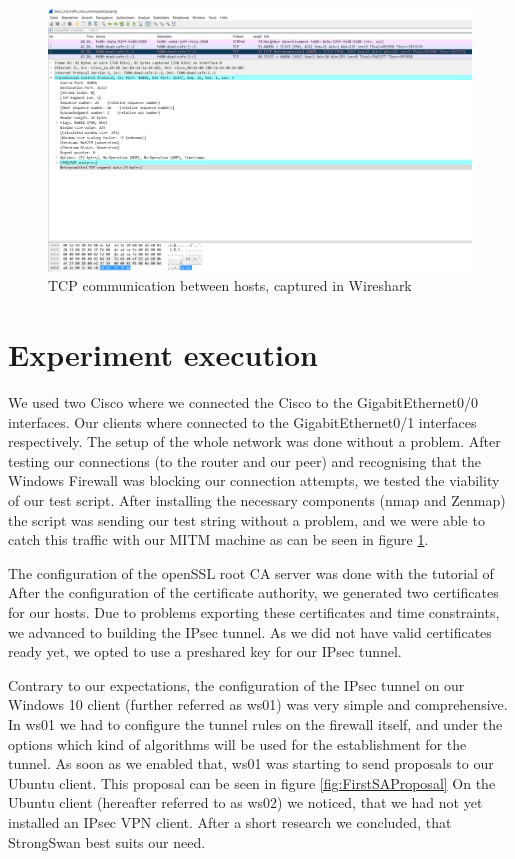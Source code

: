 \documentclass[a4paper]{report}
\begin{document}
\begin{figure}[htb]
	\includegraphics[width=\linewidth]{Testscript_unencrypted.png}
	\caption{TCP communication between hosts, captured in Wireshark}
	\label{fig:TestUnencrypted}
\end{figure}


\section{Experiment execution}
\label{sec:ExpExec}
We used two Cisco %
where we connected the Cisco %
to the GigabitEthernet0/0 interfaces. Our clients where connected to the GigabitEthernet0/1 interfaces respectively. The setup of the whole network was done without a problem. After testing our connections (to the router and our peer) and recognising that the Windows Firewall was blocking our connection attempts, we tested the viability of our test script. After installing the necessary components (nmap and Zenmap) the script was sending our test string without a problem, and we were able to catch this traffic with our MITM machine as can be seen in figure \ref{fig:TestUnencrypted}. 

The configuration of the openSSL root CA server was done with the tutorial of %
After the configuration of the certificate authority, we generated two certificates for our hosts. Due to problems exporting these certificates and time constraints, we advanced to building the IPsec tunnel. As we did not have valid certificates ready yet, we opted to use a preshared key for our IPsec tunnel.

Contrary to our expectations, the configuration of the IPsec tunnel on our Windows 10 client (further referred as ws01) was very simple and comprehensive. In ws01 we had to configure the tunnel rules on the firewall itself, and under the options which kind of algorithms will be used for the establishment for the tunnel. As soon as we enabled that, ws01 was starting to send proposals to our Ubuntu client. This proposal can be seen in figure \ref{fig:FirstSAProposal}
On the Ubuntu client (hereafter referred to as ws02) we noticed, that we had not yet installed an IPsec VPN client. After a short research we concluded, that StrongSwan best suits our need.
\end{document}
